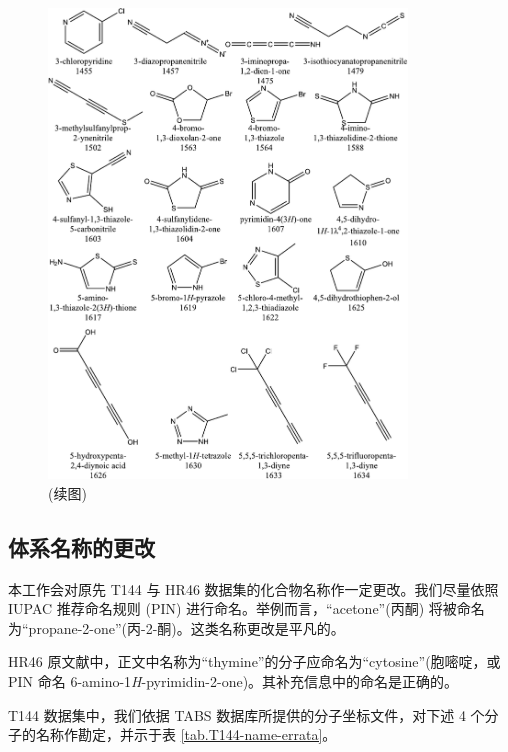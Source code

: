 \begin{figure}[!p]
    \centering
    \includegraphics[width=0.85\textwidth]{assets/fig-s2-5.pdf}
    \caption[]{(续图)}
    \label{fig.fig-s2-5}
\end{figure}

\clearpage

\subsection{体系名称的更改}
\label{sec.T145-HR46-name-change}

本工作会对原先 T144 与 HR46 数据集的化合物名称作一定更改。我们尽量依照 IUPAC 推荐命名规则 (PIN) 进行命名\cite{Favre-Powell.RSC.2013}。举例而言，“acetone”(丙酮) 将被命名为“propane-2-one”(丙-2-酮)。这类名称更改是平凡的。

HR46 原文献\cite{Hickey-Rowley.JPCA.2014}中，正文中名称为“thymine”的分子应命名为“cytosine”(胞嘧啶，或 PIN 命名 6-amino-1\textit{H}-pyrimidin-2-one)。其补充信息中的命名是正确的。

T144 数据集中，我们依据 TABS 数据库所提供的分子坐标文件，对下述 4 个分子的名称作勘定，并示于表 \ref{tab.T144-name-errata}。

